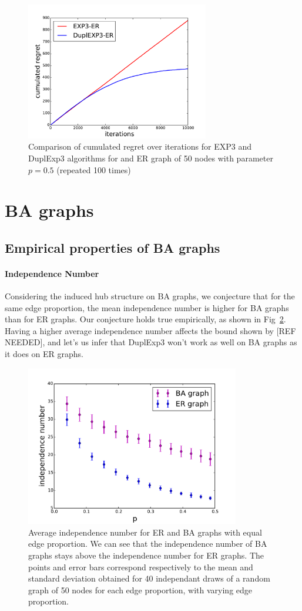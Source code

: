 \documentclass[10pt,a4paper]{scrartcl}
\begin{document}
\begin{figure}[h!]
\centering
\includegraphics[height=6cm]{figures/50new_dupl_big_r05.pdf}
\caption{Comparison of cumulated regret over iterations for EXP3 and DuplExp3 algorithms for and ER graph of 50 nodes with parameter $p=0.5$ (repeated 100 times)}
\label{duplexp3vsexp3ER}
\end{figure}

\section{BA graphs}
\subsection{Empirical properties of BA graphs}
\paragraph{Independence Number}
Considering the induced hub structure on BA graphs, we conjecture that for the same edge proportion, the mean independence number is higher for BA graphs than for ER graphs.  Our conjecture holds true empirically, as shown in Fig~\ref{mean_alpha_ba_er}. Having a higher average independence number affects the bound shown by [REF NEEDED], and let's us infer that DuplExp3 won't work as well on BA graphs as it does on ER graphs.

\begin{figure}[h!]
\centering
 \includegraphics[height=7cm]{figures/independance_number_com.pdf}
 \caption{Average independence number for ER and BA graphs with equal edge proportion. We can see that the independence number of BA graphs stays above the independence number for ER graphs. The points and error bars correspond respectively to the mean and standard deviation obtained for 40 independant draws of a random graph of 50 nodes for each edge proportion, with varying edge proportion.}
 \label{mean_alpha_ba_er}
\end{figure}
\end{document}
